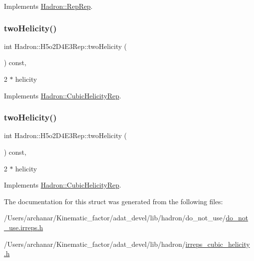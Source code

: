 Implements \mbox{\hyperlink{structHadron_1_1RepRep_ab3213025f6de249f7095892109575fde}{Hadron\+::\+Rep\+Rep}}.

\mbox{\label{structHadron_1_1H5o2D4E3Rep_aafa508ed82fe94a7f52855aa9b8a4c74}} 
\subsubsection{\texorpdfstring{twoHelicity()}{twoHelicity()}\hspace{0.1cm}{\footnotesize\ttfamily [1/2]}}
{\footnotesize\ttfamily int Hadron\+::\+H5o2\+D4\+E3\+Rep\+::two\+Helicity (\begin{DoxyParamCaption}{ }\end{DoxyParamCaption}) const\hspace{0.3cm}{\ttfamily [inline]}, {\ttfamily [virtual]}}

2 $\ast$ helicity 

Implements \mbox{\hyperlink{structHadron_1_1CubicHelicityRep_af507aa56fc2747eacc8cb6c96db31ecc}{Hadron\+::\+Cubic\+Helicity\+Rep}}.

\mbox{\label{structHadron_1_1H5o2D4E3Rep_aafa508ed82fe94a7f52855aa9b8a4c74}} 
\subsubsection{\texorpdfstring{twoHelicity()}{twoHelicity()}\hspace{0.1cm}{\footnotesize\ttfamily [2/2]}}
{\footnotesize\ttfamily int Hadron\+::\+H5o2\+D4\+E3\+Rep\+::two\+Helicity (\begin{DoxyParamCaption}{ }\end{DoxyParamCaption}) const\hspace{0.3cm}{\ttfamily [inline]}, {\ttfamily [virtual]}}

2 $\ast$ helicity 

Implements \mbox{\hyperlink{structHadron_1_1CubicHelicityRep_af507aa56fc2747eacc8cb6c96db31ecc}{Hadron\+::\+Cubic\+Helicity\+Rep}}.



The documentation for this struct was generated from the following files\+:\begin{DoxyCompactItemize}
\item 
/\+Users/archanar/\+Kinematic\+\_\+factor/adat\+\_\+devel/lib/hadron/do\+\_\+not\+\_\+use/\mbox{\hyperlink{do__not__use_8irreps_8h}{do\+\_\+not\+\_\+use.\+irreps.\+h}}\item 
/\+Users/archanar/\+Kinematic\+\_\+factor/adat\+\_\+devel/lib/hadron/\mbox{\hyperlink{lib_2hadron_2irreps__cubic__helicity_8h}{irreps\+\_\+cubic\+\_\+helicity.\+h}}\end{DoxyCompactItemize}
